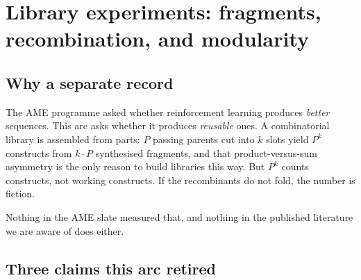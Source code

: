 %
%

\section{Library experiments: fragments, recombination, and modularity}

\subsection*{Why a separate record}

The AME programme asked whether reinforcement learning produces \emph{better}
sequences. This arc asks whether it produces \emph{reusable} ones. A
combinatorial library is assembled from parts: $P$ passing parents cut into $k$
slots yield $P^k$ constructs from $k \cdot P$ synthesised fragments, and that
product-versus-sum asymmetry is the only reason to build libraries this way. But
$P^k$ counts constructs, not working constructs. If the recombinants do not
fold, the number is fiction.

Nothing in the AME slate measured that, and nothing in the published literature
we are aware of does either.

\subsection*{Three claims this arc retired}

